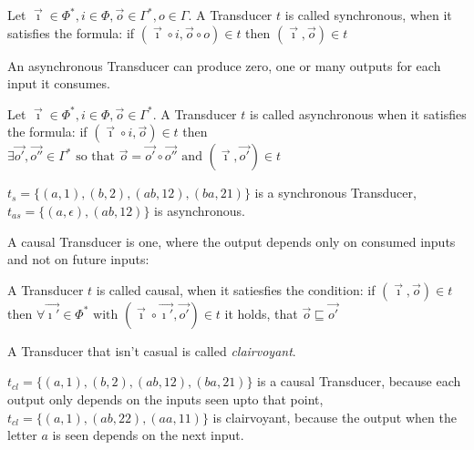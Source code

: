 \begin{definition}[name = Synchronous Transducer]\label{def:synchronous_transducer}
Let \(\vec{\imath} \in \Phi^*, i \in \Phi, \vec{o} \in \Gamma^*, o \in \Gamma\).
  A Transducer \(t\) is called synchronous, when it satisfies the formula:
  if \( (\vec{\imath}\circ i,\vec{o}\circ o) \in t\)
  then \( (\vec{\imath}, \vec{o}) \in t \)
\end{definition}

An asynchronous Transducer can produce zero, one or many outputs for each input it consumes.

\begin{definition}[name = Asynchronous Transducer]\label{def:asynchronous_transducer}
  Let \(\vec{\imath}\in \Phi^*, i \in \Phi,\vec{o} \in \Gamma^*\).
  A Transducer \(t\) is called asynchronous when it satisfies the formula:
  if \((\vec{\imath}\circ i, \vec{o}) \in t \)
  then \(\exists \vec{o'},\vec{o''} \in \Gamma^*\text{ so that } \vec{o} = \vec{o'}\circ\vec{o''} \text{ and } (\vec{\imath},\vec{o'}) \in t \)
\end{definition}

\begin{exmp}[name = Synchronous and Asynchronous Transducers]
  \(t_s = \{(a,1),(b,2),(ab,12),(ba,21)\}\) is a synchronous Transducer, \(t_{as} = \{(a,\epsilon),(ab,12)\}\) is asynchronous.
\end{exmp}

A causal Transducer is one, where the output depends only on consumed inputs and not on future inputs:

\begin{definition}[name = Causal and Clairvoyant Transducers]\label{def:causal_transducer}
  A Transducer \(t\) is called causal, when it satiesfies the condition:
  if \((\vec{\imath},\vec{o}) \in t \)
  then \( \forall \vec{\imath'} \in \Phi^* \text{ with } (\vec{\imath} \circ \vec{\imath'}, \vec{o'}) \in t \)
  it holds, that \( \vec{o} \sqsubseteq \vec{o'} \)

  A Transducer that isn't casual is called \emph{clairvoyant}.
\end{definition}


\begin{exmp}[name = Causal and Clairvoyant Transducers]
  \(t_{cl} = \{(a,1),(b,2),(ab,12),(ba,21)\}\) is a causal Transducer, because each output only depends on the inputs seen upto that point, \(t_{cl} = \{(a,1),(ab,22),(aa,11)\}\) is clairvoyant, because the output when the letter \(a\) is seen depends on the next input.
\end{exmp}

